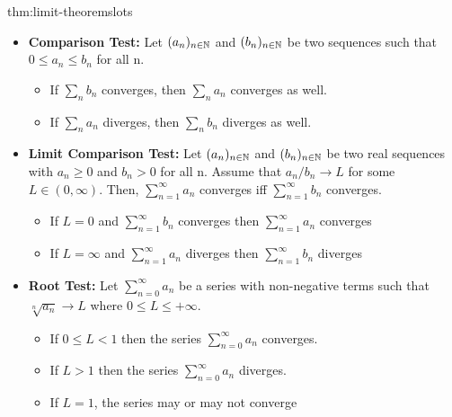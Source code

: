 \documentclass[landscape, 8pt]{extarticle}
\begin{document}
\begin{multicols}{3}
\begin{thm}{thm:limit-theorems}{lots}
\begin{itemize}
    \item \textbf{Comparison Test:} Let $(a_n)_{n\in\mathbb{N}}$ and $(b_n)_{n\in\mathbb{N}}$ be two sequences such that $0\leq a_n\leq b_n$ for all n.
    \renewcommand\labelitemi{\tiny$\bullet$}
    \vspace{-5pt}
    \begin{itemize}
        \setlength\itemsep{0em}
        \item If $\sum_n b_n$ converges, then $\sum_n a_n$ converges as well.
        \item If $\sum_n a_n$ diverges, then $\sum_n b_n$ diverges as well.
    \end{itemize}
    \vspace{-5pt}

    \item \textbf{Limit Comparison Test:} Let $(a_n)_{n\in\mathbb{N}}$ and $(b_n)_{n\in\mathbb{N}}$ be two real sequences with $a_n\geq0$ and $b_n > 0$ for all n. Assume that $a_n / b_n \to L$ for some $L\in(0,\infty)$. Then, $\sum_{n=1}^{\infty}  a_n$ converges iff $\sum_{n=1}^{\infty}  b_n$ converges. 
    \renewcommand\labelitemi{\tiny$\bullet$}
    \vspace{-5pt}
    \begin{itemize}
        \setlength\itemsep{0em}
        \item If $L=0$ and $\sum_{n=1}^{\infty}b_{n}$ converges then $\sum_{n=1}^{\infty} a_{n}$ converges
        \item If $L=\infty$ and $\sum_{n=1}^{\infty}a_{n}$ diverges then $\sum_{n=1}^{\infty} b_{n}$ diverges
    \end{itemize}
    \vspace{-5pt}
    
    \item \textbf{Root Test:} Let $\sum_{n=0}^{\infty} a_n$ be a series with non-negative terms such that $\sqrt[n]{a_n} \to L$ where $0 \le L \le +\infty$.
    \renewcommand\labelitemi{\tiny$\bullet$}
    \vspace{-5pt}
    \begin{itemize}
        \setlength\itemsep{0em}
        \item If $0\le L < 1$ then the series $\sum_{n=0}^{\infty}  a_n$ converges.
        \item If $L > 1$ then the series $\sum_{n=0}^{\infty}  a_n$ diverges.
        \item If $L = 1$, the series may or may not converge
    \end{itemize}
    \vspace{-5pt}


\end{itemize}
\end{thm}
\end{multicols}
\end{document}
